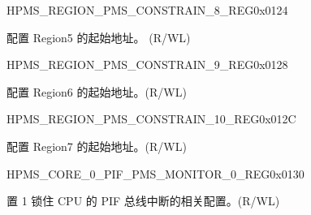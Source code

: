 \begin{register}{H}{PMS\_REGION\_PMS\_CONSTRAIN\_8\_REG}{0x0124}\label{regdesc:PMSREGIONPMSCONSTRAIN8REG}
%
%
\regnewline%
\begin{regdesc}\begin{reglist}
\label{fielddesc:PMSREGIONPMSCONSTRAINADDR5}\item [PMS\_REGION\_PMS\_CONSTRAIN\_ADDR\_5] 配置 Region5 的起始地址。 (R/WL)
\end{reglist}\end{regdesc}
\end{register}


\begin{register}{H}{PMS\_REGION\_PMS\_CONSTRAIN\_9\_REG}{0x0128}\label{regdesc:PMSREGIONPMSCONSTRAIN9REG}
%
%
\regnewline%
\begin{regdesc}\begin{reglist}
\label{fielddesc:PMSREGIONPMSCONSTRAINADDR6}\item [PMS\_REGION\_PMS\_CONSTRAIN\_ADDR\_6] 配置 Region6 的起始地址。(R/WL)
\end{reglist}\end{regdesc}
\end{register}


\begin{register}{H}{PMS\_REGION\_PMS\_CONSTRAIN\_10\_REG}{0x012C}\label{regdesc:PMSREGIONPMSCONSTRAIN10REG}
%
%
\regnewline%
\begin{regdesc}\begin{reglist}
\label{fielddesc:PMSREGIONPMSCONSTRAINADDR7}\item [PMS\_REGION\_PMS\_CONSTRAIN\_ADDR\_7] 配置 Region7 的起始地址。(R/WL)
\end{reglist}\end{regdesc}
\end{register}


\begin{register}{H}{PMS\_CORE\_0\_PIF\_PMS\_MONITOR\_0\_REG}{0x0130}\label{regdesc:PMSCORE0PIFPMSMONITOR0REG}
%
%
\regnewline%
\begin{regdesc}\begin{reglist}
\label{fielddesc:PMSCORE0PIFPMSMONITORLOCK}\item [PMS\_CORE\_0\_PIF\_PMS\_MONITOR\_LOCK] 置 1 锁住 CPU 的 PIF 总线中断的相关配置。(R/WL)
\end{reglist}\end{regdesc}
\end{register}


